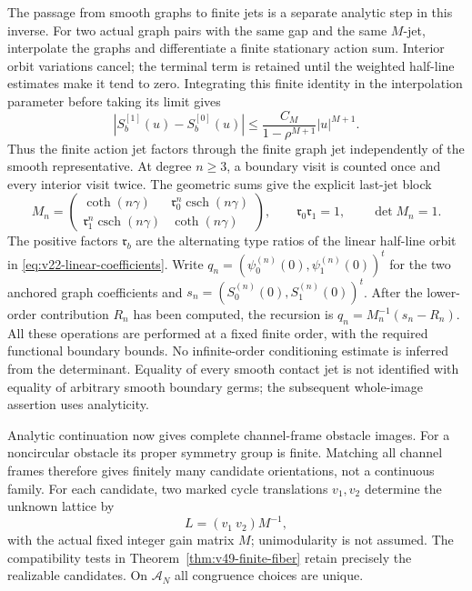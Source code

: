 The passage from smooth graphs to finite jets is a separate analytic
step in this inverse.  For two actual graph pairs with the same gap
and the same $M$-jet, interpolate the graphs and differentiate a
finite stationary action sum.  Interior orbit variations cancel;
the terminal term is retained until the weighted half-line estimates
make it tend to zero.  Integrating this finite identity in the
interpolation parameter before taking its limit gives
\begin{equation}\label{eq:v50-smooth-filtration}
 |S_b^{[1]}(u)-S_b^{[0]}(u)|
       \le \frac{C_M}{1-\rho^{M+1}}|u|^{M+1}.
\end{equation}
Thus the finite action jet factors through the finite graph jet
independently of the smooth representative.  At degree $n\ge3$,
a boundary visit is counted once and every interior visit twice.
The geometric sums give the explicit last-jet block
\begin{equation}\label{eq:v50-jet-block}
 M_n=\begin{pmatrix}
 \coth(n\gamma)&\mathfrak r_0^n\operatorname{csch}(n\gamma)\\
 \mathfrak r_1^n\operatorname{csch}(n\gamma)&\coth(n\gamma)
 \end{pmatrix},\qquad \mathfrak r_0\mathfrak r_1=1,
 \qquad \det M_n=1.
\end{equation}
The positive factors $\mathfrak r_b$ are the alternating type ratios
of the linear half-line orbit in \eqref{eq:v22-linear-coefficients}.
Write $q_n=(\psi_0^{(n)}(0),\psi_1^{(n)}(0))^t$ for the two
anchored graph coefficients and $s_n=(S_0^{(n)}(0),S_1^{(n)}(0))^t$.
After the lower-order contribution $R_n$ has been computed, the
recursion is $q_n=M_n^{-1}(s_n-R_n)$.  All these operations are
performed at a fixed finite order, with the required functional
boundary bounds.  No infinite-order conditioning estimate is inferred
from the determinant.  Equality of every smooth contact jet is not
identified with equality of arbitrary smooth boundary germs; the
subsequent whole-image assertion uses analyticity.

Analytic continuation now gives complete channel-frame obstacle images.
For a noncircular obstacle its proper symmetry group is finite.  Matching
all channel frames therefore gives finitely many candidate orientations,
not a continuous family.  For each candidate, two marked cycle
translations $v_1,v_2$ determine the unknown lattice by
\[
                      L=(v_1\ v_2)M^{-1},
\]
with the actual fixed integer gain matrix $M$; unimodularity is not
assumed.  The compatibility tests in
Theorem~\ref{thm:v49-finite-fiber} retain precisely the realizable
candidates.  On $\mathscr A_N$ all congruence choices are unique.


